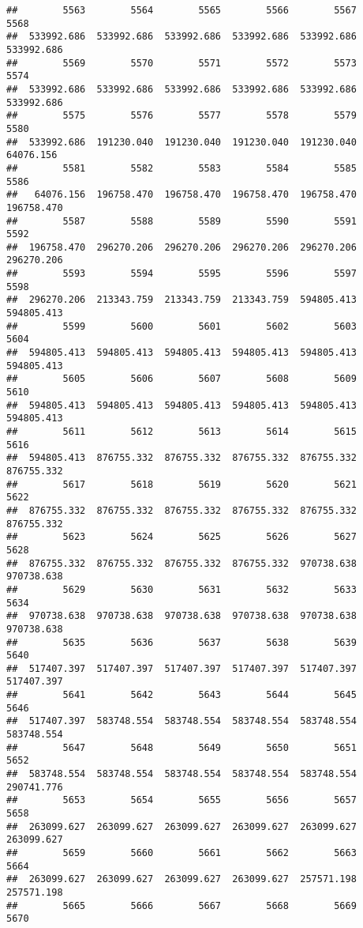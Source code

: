 \documentclass[
]{book}
\begin{document}
\begin{verbatim}
##        5563        5564        5565        5566        5567        5568 
##  533992.686  533992.686  533992.686  533992.686  533992.686  533992.686 
##        5569        5570        5571        5572        5573        5574 
##  533992.686  533992.686  533992.686  533992.686  533992.686  533992.686 
##        5575        5576        5577        5578        5579        5580 
##  533992.686  191230.040  191230.040  191230.040  191230.040   64076.156 
##        5581        5582        5583        5584        5585        5586 
##   64076.156  196758.470  196758.470  196758.470  196758.470  196758.470 
##        5587        5588        5589        5590        5591        5592 
##  196758.470  296270.206  296270.206  296270.206  296270.206  296270.206 
##        5593        5594        5595        5596        5597        5598 
##  296270.206  213343.759  213343.759  213343.759  594805.413  594805.413 
##        5599        5600        5601        5602        5603        5604 
##  594805.413  594805.413  594805.413  594805.413  594805.413  594805.413 
##        5605        5606        5607        5608        5609        5610 
##  594805.413  594805.413  594805.413  594805.413  594805.413  594805.413 
##        5611        5612        5613        5614        5615        5616 
##  594805.413  876755.332  876755.332  876755.332  876755.332  876755.332 
##        5617        5618        5619        5620        5621        5622 
##  876755.332  876755.332  876755.332  876755.332  876755.332  876755.332 
##        5623        5624        5625        5626        5627        5628 
##  876755.332  876755.332  876755.332  876755.332  970738.638  970738.638 
##        5629        5630        5631        5632        5633        5634 
##  970738.638  970738.638  970738.638  970738.638  970738.638  970738.638 
##        5635        5636        5637        5638        5639        5640 
##  517407.397  517407.397  517407.397  517407.397  517407.397  517407.397 
##        5641        5642        5643        5644        5645        5646 
##  517407.397  583748.554  583748.554  583748.554  583748.554  583748.554 
##        5647        5648        5649        5650        5651        5652 
##  583748.554  583748.554  583748.554  583748.554  583748.554  290741.776 
##        5653        5654        5655        5656        5657        5658 
##  263099.627  263099.627  263099.627  263099.627  263099.627  263099.627 
##        5659        5660        5661        5662        5663        5664 
##  263099.627  263099.627  263099.627  263099.627  257571.198  257571.198 
##        5665        5666        5667        5668        5669        5670 

\end{verbatim}
\end{document}
